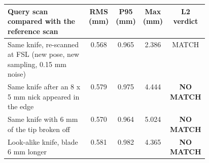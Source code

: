 \begin{tabular}{@{}p{0.46\linewidth}cccc@{}}
\toprule
Query scan compared with the reference scan & RMS (mm) & P95 (mm) & Max (mm) & L2 verdict\\
\midrule
Same knife, re-scanned at FSL (new pose, new sampling, 0.15 mm noise) & 0.568 & 0.965 & 2.386 & MATCH\\
Same knife after an 8 x 5 mm nick appeared in the edge & 0.579 & 0.975 & 4.444 & \textbf{NO MATCH}\\
Same knife with 6 mm of the tip broken off & 0.570 & 0.964 & 5.024 & \textbf{NO MATCH}\\
Look-alike knife, blade 6 mm longer & 0.581 & 0.982 & 4.365 & \textbf{NO MATCH}\\
\bottomrule
\end{tabular}

